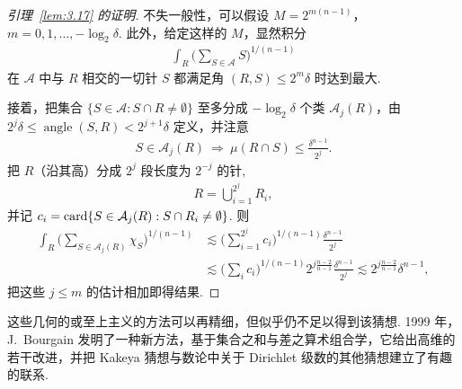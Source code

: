 \begin{proof}[引理~\ref{lem:3.17} 的证明]
不失一般性，可以假设 $M = 2^{m(n-1)}$，$m = 0,1,\ldots,-\log_2\delta$. 此外，给定这样的 $M$，显然积分
\begin{align*}
  \int_{R}\Big(\sum_{S\in\mathcal{A}}S\Big)^{1/(n-1)}
\end{align*}
在 $\mathcal{A}$ 中与 $R$ 相交的一切针 $S$ 都满足角 $(R, S) \leq 2^m \delta$ 时达到最大.

接着，把集合 $\{S \in \mathcal{A} : S \cap R \neq \emptyset\}$ 至多分成 $-\log_2 \delta$ 个类 $\mathcal{A}_j(R)$，由 $2^j \delta \leq \operatorname{angle}(S, R) < 2^{j+1} \delta$ 定义，并注意
\begin{align*}
  S\in\mathcal{A}_{j}(R)\ \Longrightarrow\ \mu(R\cap S)\leq\frac{\delta^{n-1}}{2^{j}}.
\end{align*}
把 $R$（沿其高）分成 $2^j$ 段长度为 $2^{-j}$ 的针,
\begin{align*}
  R=\bigcup_{i=1}^{2^{j}}R_{i},
\end{align*}
并记 $c_i = \operatorname{card}\{S \in \mathcal{A}_j(R) : S \cap R_i \neq \emptyset\}$. 则
\begin{align*}
  \int_{R}\Big(\sum_{S\in\mathcal{A}_{j}(R)}\chi_{S}\Big)^{1/(n-1)}
  &\lesssim\Big(\sum_{i=1}^{2^{j}}c_{i}\Big)^{1/(n-1)}\frac{\delta^{n-1}}{2^{j}}\\
  &\lesssim\Big(\sum_{i}c_{i}\Big)^{1/(n-1)}2^{j\frac{n-2}{n-1}}\frac{\delta^{n-1}}{2^{j}}
  \lesssim 2^{j\frac{n-2}{n-1}}\delta^{n-1},
\end{align*}
把这些 $j \leq m$ 的估计相加即得结果.
\end{proof}

这些几何的或至上主义的方法可以再精细，但似乎仍不足以得到该猜想. 1999 年，J.~Bourgain 发明了一种新方法，基于集合之和与差之算术组合学，它给出高维的若干改进，并把 Kakeya 猜想与数论中关于 Dirichlet 级数的其他猜想建立了有趣的联系.

